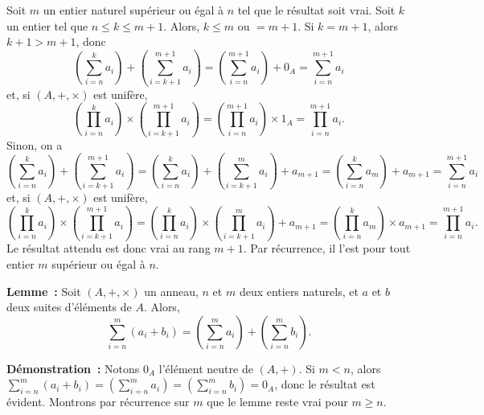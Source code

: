     Soit $m$ un entier naturel supérieur ou égal à $n$ tel que le résultat soit vrai.
    Soit $k$ un entier tel que $n \leq k \leq m+1$. 
    Alors, $k \leq m$ ou $ = m+1$.
    Si $k = m+1$, alors $k+1 > m+1$, donc 
    \begin{equation*}
        \left( \sum_{i=n}^k a_i \right) + \left( \sum_{i=k+1}^{m+1} a_i \right)
        = \left( \sum_{i=n}^{m+1} a_i \right) + 0_A
        = \sum_{i=n}^{m+1} a_i 
    \end{equation*}
    et, si $(A, +, \times)$ est unifère, 
    \begin{equation*}
        \left( \prod_{i=n}^k a_i \right) \times \left( \prod_{i=k+1}^{m+1} a_i \right)
        = \left( \prod_{i=n}^{m+1} a_i \right) \times 1_A
        = \prod_{i=n}^{m+1} a_i .
    \end{equation*}
    Sinon, on a
    \begin{equation*}
        \left( \sum_{i=n}^k a_i \right) + \left( \sum_{i=k+1}^{m+1} a_i \right)
        = \left( \sum_{i=n}^k a_i \right) + \left( \sum_{i=k+1}^m a_i \right) + a_{m+1}
        = \left( \sum_{i=n}^k a_m \right) + a_{m+1}
        = \sum_{i=n}^{m+1} a_i
    \end{equation*}
    et, si $(A, +, \times)$ est unifère, 
    \begin{equation*}
        \left( \prod_{i=n}^k a_i \right) \times \left( \prod_{i=k+1}^{m+1} a_i \right)
        = \left( \prod_{i=n}^k a_i \right) \times \left( \prod_{i=k+1}^m a_i \right) + a_{m+1}
        = \left( \prod_{i=n}^k a_m \right) \times a_{m+1}
        = \prod_{i=n}^{m+1} a_i .
    \end{equation*}
    Le résultat attendu est donc vrai au rang $m+1$.
    Par récurrence, il l'est pour tout entier $m$ supérieur ou égal à $n$.

    \done

\noindent\textbf{Lemme :} Soit $(A, +, \times)$ un anneau, $n$ et $m$ deux entiers naturels, et $a$ et $b$ deux suites d'éléments de $A$. 
    Alors,
    \begin{equation*}
        \sum_{i=n}^m (a_i + b_i) = \left( \sum_{i=n}^m a_i \right) + \left( \sum_{i=n}^m b_i \right) .
    \end{equation*}

\medskip

\noindent\textbf{Démonstration :} 
    Notons $0_A$ l'élément neutre de $(A, +)$.
    Si $m < n$, alors $\sum_{i=n}^m (a_i + b_i) = \left( \sum_{i=n}^m a_i \right) = \left( \sum_{i=n}^m b_i \right) = 0_A$, donc le résultat est évident.
    Montrons par récurrence sur $m$ que le lemme reste vrai pour $m \geq n$.

